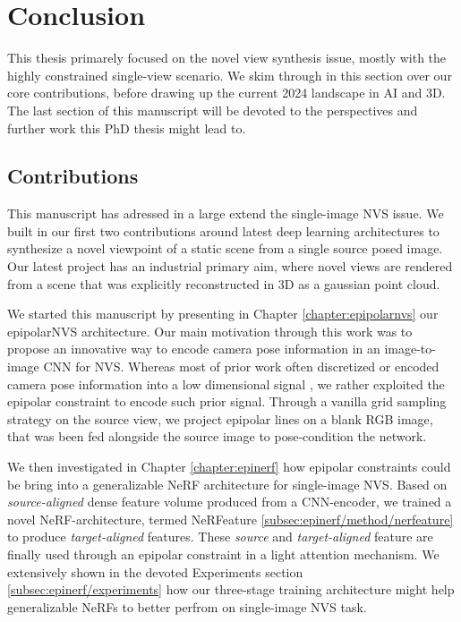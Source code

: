 \chapter{Conclusion}
\label{chapter:conclusion}

{}


This thesis primarely focused on the novel view synthesis issue, mostly with the highly constrained single-view scenario. We skim through in this section over our core contributions, before drawing up  the current 2024 landscape in \ac{AI} and 3D. The last section of this manuscript will be devoted to the perspectives and further work this PhD thesis might lead to. 

\section{Contributions}

This manuscript has adressed in a large extend the single-image \ac{NVS} issue. We built in our first two contributions around latest deep learning architectures to synthesize a novel viewpoint of a static scene from a single source posed image. Our latest project has an industrial primary aim, where novel views are rendered from a scene that was explicitly reconstructed in 3D as a gaussian point cloud.

We started this manuscript by presenting in Chapter \ref{chapter:epipolarnvs} our epipolarNVS architecture. Our main motivation through this work was to propose an innovative way to encode camera pose information in an image-to-image \ac{CNN} for \ac{NVS}. Whereas most of prior work often discretized \citep{kim2020novel} or encoded camera pose information into a low dimensional signal \citep{sun2018multiview}, we rather exploited the epipolar constraint to encode such prior signal. Through a vanilla grid sampling strategy on the source view, we project epipolar lines on a blank RGB image, that was been fed alongside the source image to pose-condition the network. 

We then investigated in Chapter \ref{chapter:epinerf} how epipolar constraints could be bring into a generalizable \ac{NeRF} architecture for single-image \ac{NVS}. Based on \textit{source-aligned} dense feature volume produced from a CNN-encoder, we trained a novel \ac{NeRF}-architecture, termed NeRFeature \ref{subsec:epinerf/method/nerfeature} to produce \textit{target-aligned} features. These \textit{source} and \textit{target-aligned} feature are finally used through an epipolar constraint in a light attention mechanism. We extensively shown in the devoted Experiments section \ref{subsec:epinerf/experiments} how our three-stage training architecture might help generalizable \ac{NeRF}s to better perfrom on single-image \ac{NVS} task.  

